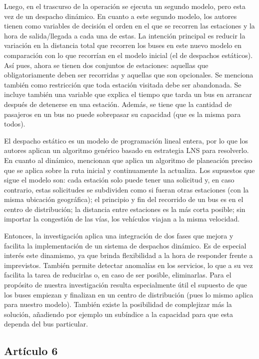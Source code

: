 \documentclass[preprint,11pt]{elsarticle}
\begin{document}
Luego, en el trascurso de la operación se ejecuta un segundo modelo, pero esta vez de un despacho dinámico. En cuanto a este segundo modelo, los autores tienen como variables de decisión el orden en el que se recorren las estaciones y la hora de salida/llegada a cada una de estas. La intención principal es reducir la variación en la distancia total que recorren los buses en este nuevo modelo en comparación con lo que recorrían en el modelo inicial (el de despachos estáticos). Así pues, ahora se tienen dos conjuntos de estaciones: aquellas que obligatoriamente deben ser recorridas y aquellas que son opcionales. Se menciona también como restricción que toda estación visitada debe ser abandonada. Se incluye también una variable que explica el tiempo que tarda un bus en arrancar después de detenerse en una estación. Además, se tiene que la cantidad de pasajeros en un bus no puede sobrepasar su capacidad (que es la misma para todos).

El despacho estático es un modelo de programación lineal entera, por lo que los autores aplican un algoritmo genérico basado en estrategia LNS para resolverlo. En cuanto al dinámico, mencionan que aplica un algoritmo de planeación preciso que se aplica sobre la ruta inicial y continuamente la actualiza. Los supuestos que sigue el modelo son: cada estación solo puede tener una solicitud y, en caso contrario, estas solicitudes se subdividen como si fueran otras estaciones (con la misma ubicación geográfica); el principio y fin del recorrido de un bus es en el centro de distribución; la distancia entre estaciones es la más corta posible; sin importar la congestión de las vías, los vehículos viajan a la misma velocidad.

Entonces, la investigación aplica una integración de dos fases que mejora y facilita la implementación de un sistema de despachos dinámico. Es de especial interés este dinamismo, ya que brinda flexibilidad a la hora de responder frente a imprevistos. También permite detectar anomalías en los servicios, lo que a su vez facilita la tarea de reducirlas o, en caso de ser posible, eliminarlas. Para el propósito de nuestra investigación resulta especialmente útil el supuesto de que los buses empiezan y finalizan en un centro de distribución (pues lo mismo aplica para nuestro modelo). También existe la posibilidad de complejizar más la solución, añadiendo por ejemplo un subíndice a la capacidad para que esta dependa del bus particular.

\subsection*{Artículo 6}
\end{document}
